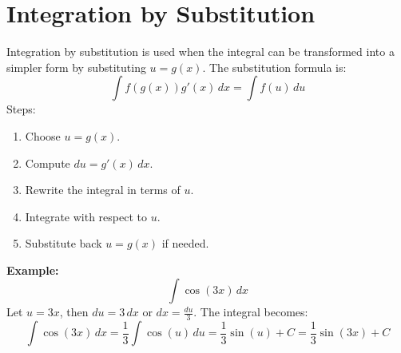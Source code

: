 \documentclass[]{article}
\begin{document}
	\section{Integration by Substitution}
	Integration by substitution is used when the integral can be transformed into a simpler form by substituting \( u = g(x) \). The substitution formula is:
	\[
	\int f(g(x))g'(x)\,dx = \int f(u)\,du
	\]
	Steps:
	\begin{enumerate}
		\item Choose \( u = g(x) \).
		\item Compute \( du = g'(x)\,dx \).
		\item Rewrite the integral in terms of \( u \).
		\item Integrate with respect to \( u \).
		\item Substitute back \( u = g(x) \) if needed.
	\end{enumerate}
	\textbf{Example:}
	\[
	\int \cos(3x)\,dx
	\]
	Let \( u = 3x \), then \( du = 3\,dx \) or \( dx = \frac{du}{3} \). The integral becomes:
	\[
	\int \cos(3x)\,dx = \frac{1}{3} \int \cos(u)\,du = \frac{1}{3}\sin(u) + C = \frac{1}{3}\sin(3x) + C
	\]
	
	
\end{document}
